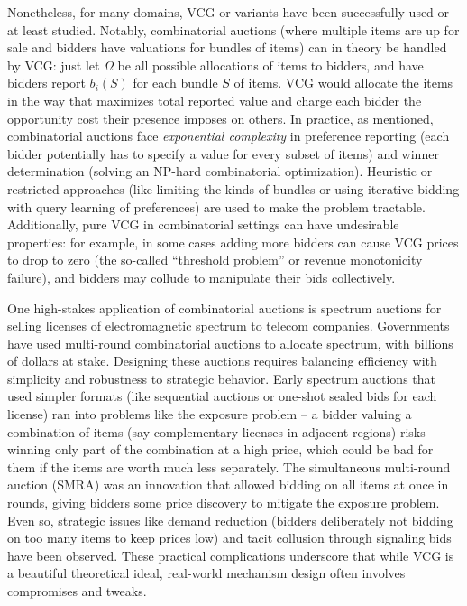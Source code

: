 \documentclass[
  letterpaper,
  numbers=noenddot,
  DIV=11]{scrreprt}
\theoremstyle{definition}
\theoremstyle{plain}
\theoremstyle{plain}
\theoremstyle{remark}
\begin{document}
Nonetheless, for many domains, VCG or variants have been successfully
used or at least studied. Notably, combinatorial auctions (where
multiple items are up for sale and bidders have valuations for bundles
of items) can in theory be handled by VCG: just let \(\Omega\) be all
possible allocations of items to bidders, and have bidders report
\(b_i(S)\) for each bundle \(S\) of items. VCG would allocate the items
in the way that maximizes total reported value and charge each bidder
the opportunity cost their presence imposes on others. In practice, as
mentioned, combinatorial auctions face \emph{exponential complexity} in
preference reporting (each bidder potentially has to specify a value for
every subset of items) and winner determination (solving an NP-hard
combinatorial optimization). Heuristic or restricted approaches (like
limiting the kinds of bundles or using iterative bidding with query
learning of preferences) are used to make the problem tractable.
Additionally, pure VCG in combinatorial settings can have undesirable
properties: for example, in some cases adding more bidders can cause VCG
prices to drop to zero (the so-called ``threshold problem'' or revenue
monotonicity failure), and bidders may collude to manipulate their bids
collectively.

One high-stakes application of combinatorial auctions is spectrum
auctions for selling licenses of electromagnetic spectrum to telecom
companies. Governments have used multi-round combinatorial auctions to
allocate spectrum, with billions of dollars at stake. Designing these
auctions requires balancing efficiency with simplicity and robustness to
strategic behavior. Early spectrum auctions that used simpler formats
(like sequential auctions or one-shot sealed bids for each license) ran
into problems like the exposure problem -- a bidder valuing a
combination of items (say complementary licenses in adjacent regions)
risks winning only part of the combination at a high price, which could
be bad for them if the items are worth much less separately. The
simultaneous multi-round auction (SMRA) was an innovation that allowed
bidding on all items at once in rounds, giving bidders some price
discovery to mitigate the exposure problem. Even so, strategic issues
like demand reduction (bidders deliberately not bidding on too many
items to keep prices low) and tacit collusion through signaling bids
have been observed. These practical complications underscore that while
VCG is a beautiful theoretical ideal, real-world mechanism design often
involves compromises and tweaks.
\end{document}
